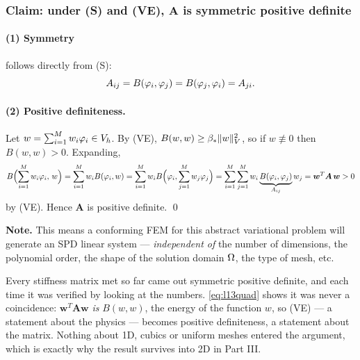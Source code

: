 \subsubsection*{Claim: under (S) and (VE), $\bm{A}$ is symmetric positive definite}

\paragraph{(1) Symmetry} follows directly from (S):
\begin{equation}
  A_{ij}=B(\varphi_{i},\varphi_{j})=B(\varphi_{j},\varphi_{i})=A_{ji}.
\end{equation}

\paragraph{(2) Positive definiteness.} Let
$w=\sum_{i=1}^{M}w_{i}\varphi_{i}\in V_{h}$. By (VE),
$B(w,w)\ge\beta_{*}\lVert w\rVert^{2}_{V}$, so if $w\not\equiv0$ then
$B(w,w)>0$. Expanding,
\begin{equation}\label{eq:l13quad}
  B\Bigl(\sum_{i=1}^{M}w_{i}\varphi_{i},\,w\Bigr)
   =\sum_{i=1}^{M}w_{i}B(\varphi_{i},w)
   =\sum_{i=1}^{M}w_{i}B\Bigl(\varphi_{i},\sum_{j=1}^{M}w_{j}\varphi_{j}\Bigr)
   =\sum_{i=1}^{M}\sum_{j=1}^{M}w_{i}\underbrace{B(\varphi_{i},\varphi_{j})}_{A_{ij}}w_{j}
   =\bm{w}^{T}\bm{A}\,\bm{w}>0
\end{equation}
by (VE). Hence $\bm{A}$ is positive definite. \qed

\medskip\noindent
\textbf{Note.} This means a conforming FEM for this abstract variational
problem will generate an SPD linear system --- \emph{independent of} the number
of dimensions, the polynomial order, the shape of the solution domain $\Omega$,
the type of mesh, etc.

\begin{intuition}
Every stiffness matrix met so far came out symmetric positive definite, and
each time it was verified by looking at the numbers. \eqref{eq:l13quad} shows
it was never a coincidence: $\bm{w}^{T}\bm{A}\bm{w}$ \emph{is} $B(w,w)$, the
energy of the function $w$, so (VE) --- a statement about the physics ---
becomes positive definiteness, a statement about the matrix. Nothing about 1D,
cubics or uniform meshes entered the argument, which is exactly why the result
survives into 2D in Part III.
\end{intuition}


